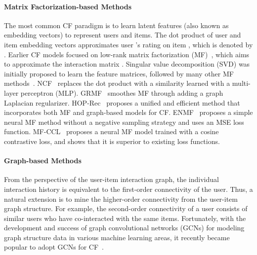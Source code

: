 \documentclass[sigconf,natbib=true]{acmart}
\begin{document}
\paragraph{Matrix Factorization-based Methods} 
The most common CF paradigm is to learn latent features (also known as embedding vectors) to represent users and items. The dot product of user and item embedding vectors  approximates user ’s rating on item , which is denoted by . Earlier CF models focused on low-rank matrix factorization (MF)~\cite{koren2009MF}, which aims to approximate the interaction matrix . Singular value decomposition (SVD) was initially proposed to learn the feature matrices, followed by many other MF methods~\cite{Mnih2007PMF,rendle2009BPR,Rao2015GRMF,He2017NCF,Yi2018LRML,yang2018hop,chen2020ENMF}. NCF~\cite{He2017NCF} replaces the dot product with a similarity learned with a multi-layer perceptron (MLP). GRMF~\cite{Rao2015GRMF} smoothes MF through adding a graph Laplacian regularizer. HOP-Rec~\cite{yang2018hop} proposes a unified and efficient method that incorporates both MF and graph-based models for CF. ENMF~\cite{chen2020ENMF} proposes a simple neural MF method without a negative sampling strategy and uses an MSE loss function. MF-CCL~\cite{mao2021simplex} proposes a neural MF model trained with a cosine contrastive loss, and shows that it is superior to existing loss functions.





\paragraph{Graph-based Methods} From the perspective of the user-item interaction graph, the individual interaction history is equivalent to the first-order connectivity of the user. Thus, a natural extension is to mine the higher-order connectivity from the user-item graph structure. For example, the second-order connectivity of a user consists of similar users who have co-interacted with the same items. Fortunately, with the development and success of graph convolutional networks (GCNs) for modeling graph structure data in various machine learning areas, it recently became popular to adopt GCNs for CF~\cite{Wang19NGCF,chen20LRGCCF,He20LightGCN,Rianne2017GCMC,Rex2018pinsage,choi2021ltocf,Shen21GFCF,sun2020NIA-GCN,Mao21UltraGCN}.
\end{document}

